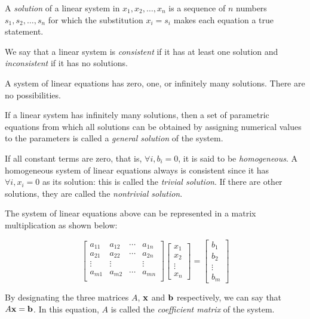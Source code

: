 \documentclass{report}
\begin{document}
		A \emph{solution} of a linear system in $x_1,x_2,\dots,x_n$ is a sequence of $n$ numbers $s_1,s_2,\dots,s_n$ for which the substitution $x_i=s_i$ makes each equation a true statement.
		
		We say that a linear system is \emph{consistent} if it has at least one solution and \emph{inconsistent} if it has no solutions.
		
		\begin{thm}
			A system of linear equations has zero, one, or infinitely many solutions. There are no possibilities.
		\end{thm}
		
		If a linear system has infinitely many solutions, then a set of parametric equations from which all solutions can be obtained by assigning numerical values to the parameters is called a \emph{general solution} of the system.
		
		If all constant terms are zero, that is, $\forall i, b_i=0$, it is said to be \emph{homogeneous}. A homogeneous system of linear equations always is consistent since it has $\forall i, x_i=0$ as its solution: this is called the \emph{trivial solution}. If there are other solutions, they are called the \emph{nontrivial solution}.
		
		The system of linear equations above can be represented in a matrix multiplication as shown below:
		
		\begin{displaymath}
			\begin{bmatrix}
				a_{11} & a_{12} & \cdots & a_{1n} \\
				a_{21} & a_{22} & \cdots & a_{2n} \\
				\vdots & \vdots &        & \vdots \\
				a_{m1} & a_{m2} & \cdots & a_{mn} \\
			\end{bmatrix}
			\begin{bmatrix}
				x_1 \\ x_2 \\ \vdots \\ x_n
			\end{bmatrix}
			=
			\begin{bmatrix}
				b_1 \\ b_2 \\ \vdots \\ b_m
			\end{bmatrix}
		\end{displaymath}
		
		By designating the three matrices $A$, $\bf{x}$ and $\bf{b}$ respectively, we can say that $A\bf{x}=\bf{b}$. In this equation, $A$ is called the \emph{coefficient matrix} of the system.
		
\end{document}
